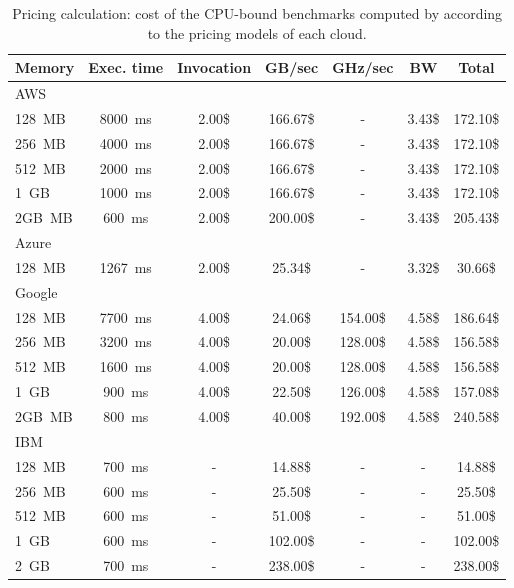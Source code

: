 \begin{table}[!t]
    \caption{Pricing calculation: cost of the CPU-bound benchmarks computed by \sys according to the pricing models of each cloud.
    \label{table:example2}}
    \setlength{\tabcolsep}{3pt}
  \scriptsize
  \center
  \begin{tabular}{l|c|c|c|c|c|c}
  \rowcolor{gray!45}
  \textbf{Memory} & \textbf{Exec. time}  & \textbf{Invocation} & \textbf{GB/sec} & \textbf{GHz/sec} & \textbf{BW} & \textbf{Total} \\
    \hline
  \rowcolor{gray!25}
    AWS  & & & & & &\\
    128~MB & 8000~ms &  2.00\$  &  166.67\$  &  - & 3.43\$ & 172.10\$ \\
    256~MB & 4000~ms &  2.00\$  &  166.67\$  &  - & 3.43\$ & 172.10\$ \\
    512~MB & 2000~ms &  2.00\$  &  166.67\$  &  - & 3.43\$ & 172.10\$ \\
	1~GB   & 1000~ms &  2.00\$  &  166.67\$  &  - & 3.43\$ & 172.10\$ \\
	2GB~MB &  600~ms &  2.00\$  &  200.00\$  &  - & 3.43\$ & 205.43\$ \\
    \hline
  \rowcolor{gray!25}
    Azure  & & & & & &\\
    128~MB & 1267~ms &  2.00\$  &   25.34\$     &  -        & 3.32\$ &  30.66\$ \\
    \hline
  \rowcolor{gray!25}
    Google  & & & & & &\\
    128~MB & 7700~ms &  4.00\$  &   24.06\$     &  154.00\$ & 4.58\$ & 186.64\$ \\
    256~MB & 3200~ms &  4.00\$  &   20.00\$     &  128.00\$ & 4.58\$ & 156.58\$ \\
    512~MB & 1600~ms &  4.00\$  &   20.00\$     &  128.00\$ & 4.58\$ & 156.58\$ \\
	1~GB   &  900~ms &  4.00\$  &   22.50\$     &  126.00\$ & 4.58\$ & 157.08\$ \\
	2GB~MB &  800~ms &  4.00\$  &   40.00\$     &  192.00\$ & 4.58\$ & 240.58\$ \\
    \hline
  \rowcolor{gray!25}
    IBM & & & & & &\\
    128~MB & 700~ms &  -       &   14.88\$     &  -        & -      &  14.88\$\\
    256~MB & 600~ms &  -       &   25.50\$     &  -        & -      &  25.50\$\\ 
    512~MB & 600~ms &  -       &   51.00\$     &  -        & -      &  51.00\$\\ 
	1~GB   & 600~ms &  -       &  102.00\$     &  -        & -      &  102.00\$\\
	2~GB   & 700~ms &  -       &  238.00\$     &  -        & -      &  238.00\$\\
    \hline
  \end{tabular}
\end{table}


